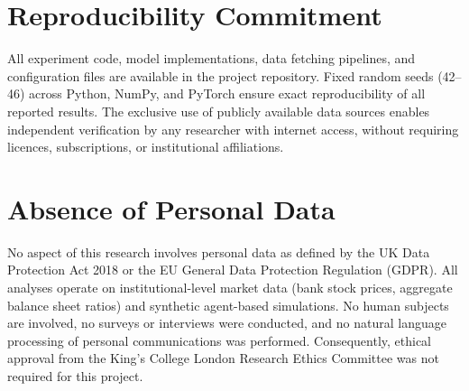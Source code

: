 \section*{Reproducibility Commitment}

All experiment code, model implementations, data fetching pipelines, and configuration files are available in the project repository. Fixed random seeds (42--46) across Python, NumPy, and PyTorch ensure exact reproducibility of all reported results. The exclusive use of publicly available data sources enables independent verification by any researcher with internet access, without requiring licences, subscriptions, or institutional affiliations.

\section*{Absence of Personal Data}

No aspect of this research involves personal data as defined by the UK Data Protection Act 2018 or the EU General Data Protection Regulation (GDPR). All analyses operate on institutional-level market data (bank stock prices, aggregate balance sheet ratios) and synthetic agent-based simulations. No human subjects are involved, no surveys or interviews were conducted, and no natural language processing of personal communications was performed. Consequently, ethical approval from the King's College London Research Ethics Committee was not required for this project.
